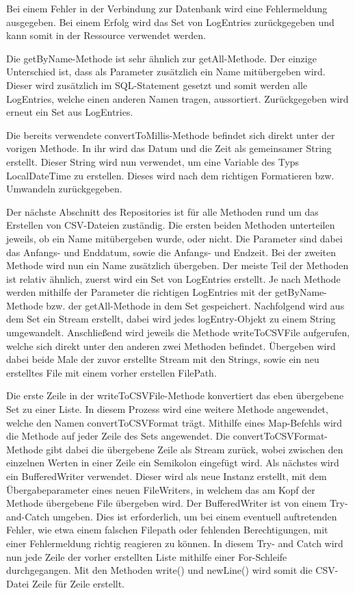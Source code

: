 Bei einem Fehler in der Verbindung zur Datenbank wird eine Fehlermeldung ausgegeben. Bei einem Erfolg wird das Set von LogEntries zurückgegeben und kann somit in der Ressource verwendet werden. 

Die getByName-Methode ist sehr ähnlich zur getAll-Methode. Der einzige Unterschied ist, dass als Parameter zusätzlich ein Name mitübergeben wird. Dieser wird zusätzlich im SQL-Statement gesetzt und somit werden alle LogEntries, welche einen anderen Namen tragen, aussortiert. Zurückgegeben wird erneut ein Set aus LogEntries.

Die bereits verwendete convertToMillis-Methode befindet sich direkt unter der vorigen Methode. In ihr wird das Datum und die Zeit als gemeinsamer String erstellt. Dieser String wird nun verwendet, um eine Variable des Typs LocalDateTime zu erstellen. Dieses wird nach dem richtigen Formatieren bzw. Umwandeln zurückgegeben.

Der nächste Abschnitt des Repositories ist für alle Methoden rund um das Erstellen von CSV-Dateien zuständig. Die ersten beiden Methoden unterteilen jeweils, ob ein Name mitübergeben wurde, oder nicht. Die Parameter sind dabei das Anfangs- und Enddatum, sowie die Anfangs- und Endzeit. Bei der zweiten Methode wird nun ein Name zusätzlich übergeben. Der meiste Teil der Methoden ist relativ ähnlich, zuerst wird ein Set von LogEntries erstellt. Je nach Methode werden mithilfe der Parameter die richtigen LogEntries mit der getByName-Methode bzw. der getAll-Methode in dem Set gespeichert. Nachfolgend wird aus dem Set ein Stream erstellt, dabei wird jedes logEntry-Objekt zu einem String umgewandelt. Anschließend wird jeweils die Methode writeToCSVFile aufgerufen, welche sich direkt unter den anderen zwei Methoden befindet. Übergeben wird dabei beide Male der zuvor erstellte Stream mit den Strings, sowie ein neu erstelltes File mit einem vorher erstellen FilePath. 

Die erste Zeile in der writeToCSVFile-Methode konvertiert das eben übergebene Set zu einer Liste. In diesem Prozess wird eine weitere Methode angewendet, welche den Namen convertToCSVFormat trägt. Mithilfe eines Map-Befehls wird die Methode auf jeder Zeile des Sets angewendet. Die convertToCSVFormat-Methode gibt dabei die übergebene Zeile als Stream zurück, wobei zwischen den einzelnen Werten in einer Zeile ein Semikolon eingefügt wird. Als nächstes wird ein BufferedWriter verwendet. Dieser wird als neue Instanz erstellt, mit dem Übergabeparameter eines neuen FileWriters, in welchem das am Kopf der Methode übergebene File übergeben wird. Der BufferedWriter ist von einem Try-and-Catch umgeben. Dies ist erforderlich, um bei einem eventuell auftretenden Fehler, wie etwa einem falschen Filepath oder fehlenden Berechtigungen, mit einer Fehlermeldung richtig reagieren zu können. In diesem Try- and Catch wird nun jede Zeile der vorher erstellten Liste mithilfe einer For-Schleife durchgegangen. Mit den Methoden write() und newLine() wird somit die CSV-Datei Zeile für Zeile erstellt. 

